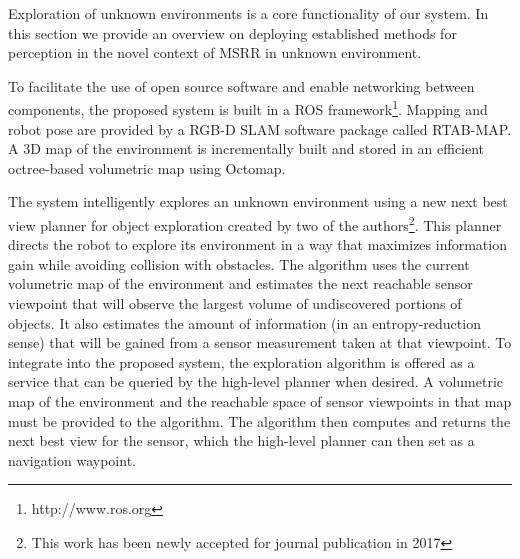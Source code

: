 \documentclass[conference]{IEEEtran}
\begin{document}

Exploration of unknown environments is a core functionality of our system. In this section we provide an overview on deploying established methods for perception in the novel context of MSRR in unknown environment.

To facilitate the use of open source software and enable networking between components, the proposed system is built in a ROS framework\footnote{http://www.ros.org}. Mapping and robot pose are provided by a RGB-D SLAM software package called RTAB-MAP\cite{rtabmap}. A 3D map of the environment is incrementally built and stored in an efficient octree-based volumetric map using Octomap\cite{octomap}.

The system intelligently explores an unknown environment using a new next best view planner for object exploration created by two of the authors\footnote{This work has been newly accepted for journal publication in 2017}. This planner directs the robot to explore its environment in a way that maximizes information gain while avoiding collision with obstacles. The algorithm uses the current volumetric map of the environment and estimates the next reachable sensor viewpoint that will observe the largest volume of undiscovered portions of objects. It also estimates the amount of information (in an entropy-reduction sense) that will be gained from a sensor measurement taken at that viewpoint. To integrate into the proposed system, the exploration algorithm is offered as a service that can be queried by the high-level planner when desired. A volumetric map of the environment and the reachable space of sensor viewpoints in that map must be provided to the algorithm. The algorithm then computes and returns the next best view for the sensor, which the high-level planner can then set as a navigation waypoint.
\end{document}
